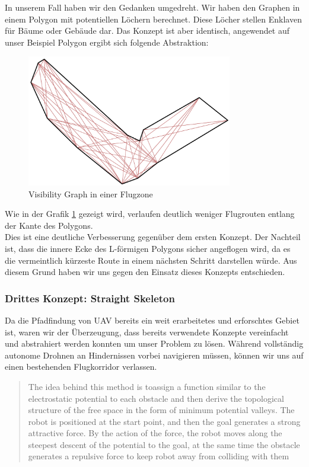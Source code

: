 In unserem Fall haben wir den Gedanken umgedreht. Wir haben den Graphen in einem Polygon mit potentiellen Löchern berechnet. Diese Löcher stellen Enklaven für Bäume oder Gebäude dar. Das Konzept ist aber identisch, angewendet auf unser Beispiel Polygon ergibt sich folgende Abstraktion:
\begin{figure}[H]
	\centering
	\includegraphics[width=0.8\textwidth]{images/routing/visibilityGraph.png}
	\caption{Visibility Graph in einer Flugzone}
	\label{fig:visibility-graph}
\end{figure}
Wie in der Grafik \ref{fig:visibility-graph} gezeigt wird, verlaufen deutlich weniger Flugrouten entlang der Kante des Polygons. \\
Dies ist eine deutliche Verbesserung gegenüber dem ersten Konzept. Der Nachteil ist, dass die innere Ecke des L-förmigen Polygons sicher angeflogen wird, da es die vermeintlich kürzeste Route in einem nächsten Schritt darstellen würde. Aus diesem Grund haben wir uns gegen den Einsatz dieses Konzepts entschieden.\\

\subsubsection{Drittes Konzept: Straight Skeleton}
Da die Pfadfindung von \Gls{UAV} bereits ein weit erarbeitetes und erforschtes Gebiet ist, waren wir der Überzeugung, dass bereits verwendete Konzepte vereinfacht und abstrahiert werden konnten um unser Problem zu lösen. Während vollständig autonome Drohnen an Hindernissen vorbei navigieren müssen, können wir uns auf einen bestehenden Flugkorridor verlassen.
\blockquote{The idea behind this method is toassign a function similar to the electrostatic potential to each obstacle and then derive the topological structure of the free space in the form of minimum potential valleys. The robot is positioned at the start point, and then the goal generates a strong attractive force. By the action of the force, the robot moves along the steepest descent of the potential to the goal, at the same time the obstacle generates a repulsive force to keep robot away from colliding with them} 


